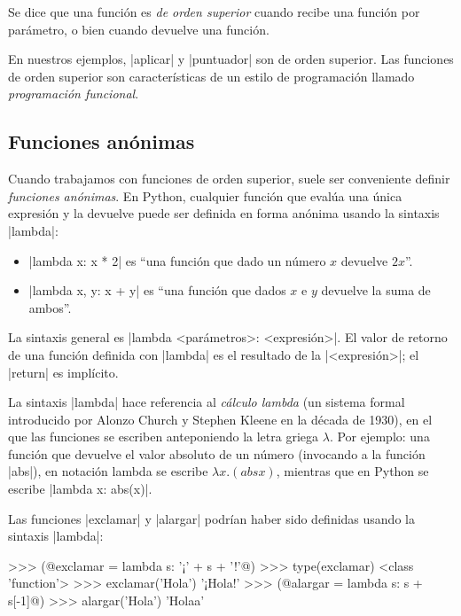 \begin{subappendices}
\begin{observacion}
Se dice que una función es \emph{de orden superior} cuando recibe una función
por parámetro, o bien cuando devuelve una función.
\end{observacion}

En nuestros ejemplos, |aplicar| y
|puntuador| son de orden superior. Las funciones de orden superior son
características de un estilo de programación llamado \emph{programación
funcional}.

\subsection*{Funciones anónimas}

Cuando trabajamos con funciones de orden superior, suele ser conveniente
definir \emph{funciones anónimas}. En Python, cualquier función que evalúa
una única expresión y la devuelve puede ser definida en forma anónima usando
la sintaxis |lambda|:

\begin{itemize}
\item |lambda x: x * 2| es ``una función que dado un número $x$ devuelve $2x$''.
\item |lambda x, y: x + y| es ``una función que dados $x$ e $y$ devuelve la suma de ambos''.
\end{itemize}

La sintaxis general es |lambda <parámetros>: <expresión>|. El valor de retorno de una
función definida con |lambda| es el resultado de la |<expresión>|; el |return| es
implícito.

\begin{sabias_que}
La sintaxis |lambda| hace referencia al \emph{cálculo lambda} (un sistema
formal introducido por Alonzo Church y Stephen Kleene en la década de
1930), en el que las funciones se escriben anteponiendo la letra griega
$\lambda$. Por ejemplo: una función que devuelve el valor absoluto de un
número (invocando a la función |abs|), en notación lambda se escribe
$\lambda x. (abs x)$, mientras que en Python se escribe |lambda x: abs(x)|.
\end{sabias_que}

Las funciones |exclamar| y |alargar| podrían haber sido definidas usando la
sintaxis |lambda|:

\begin{codigo-python-sn}
>>> (@exclamar = lambda s: '¡' + s + '!'@)
>>> type(exclamar)
<class 'function'>
>>> exclamar('Hola')
'¡Hola!'
>>> (@alargar = lambda s: s + s[-1]@)
>>> alargar('Hola')
'Holaa'
\end{codigo-python-sn}


\end{subappendices}
